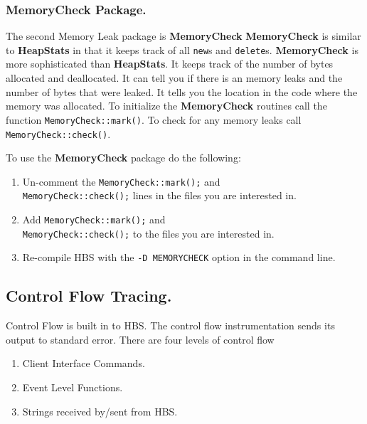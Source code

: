 \subsubsection{MemoryCheck Package.}

The second Memory Leak package is {\bf MemoryCheck}\cite{Kanze94}  {\bf
MemoryCheck} is similar to {\bf HeapStats} in that it keeps track of all
{\tt new}s and {\tt delete}s.  {\bf MemoryCheck} is more sophisticated than
{\bf HeapStats}.  It keeps track of the number of bytes allocated and
deallocated.  It can tell you if there is an memory leaks and the number of
bytes that were leaked.  It tells you the location in the code where the
memory was allocated.  To initialize the {\bf MemoryCheck} routines call
the function {\tt MemoryCheck::mark()}.  To check for any memory leaks call
{\tt MemoryCheck::check()}.

To use the {\bf MemoryCheck} package do the following:

\begin{enumerate}
\item{Un-comment the {\tt MemoryCheck::mark();} and \\
{\tt MemoryCheck::check();} lines in the files you are interested in.}
\item{Add {\tt MemoryCheck::mark();} and \\
{\tt MemoryCheck::check();} to the files you are interested in.}
\item{Re-compile HBS with the {\tt -D MEMORYCHECK} option in the command line.}
\end{enumerate}


\subsection{Control Flow Tracing.}

Control Flow is built in to HBS. The control flow instrumentation sends its
output to standard error.  There are four levels of control flow

\begin{enumerate}
\item{Client Interface Commands.}
\item{Event Level Functions.}
\item{Strings received by/sent from HBS.}
\end{enumerate}


